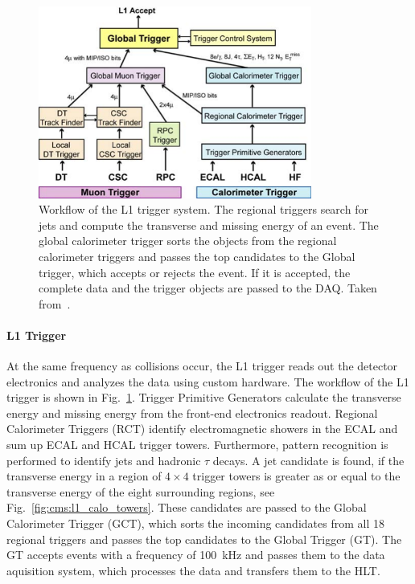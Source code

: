 \begin{figure}[htp]
    \centering
    \includegraphics[width=0.8\textwidth]{figures/cms_detector/cms_l1_trigger_new.pdf}\hfill
    \caption[The L1 Trigger of CMS]{Workflow of the L1 trigger system. The
        regional triggers search for jets and compute the transverse and missing
        energy of an event. The global calorimeter trigger sorts the objects
        from the regional calorimeter triggers and passes the top candidates to
        the Global trigger, which accepts or rejects the event. If it is
        accepted, the complete data and the trigger objects are passed to the
        DAQ. Taken from~\cite{Bayatian:922757}.} 
    \label{fig:cms:l1_trigger}
\end{figure}

\paragraph{L1 Trigger} 
At the same frequency as collisions occur, the L1 trigger reads out the detector
electronics and analyzes the data using custom hardware. The workflow of the L1
trigger is shown in Fig.~\ref{fig:cms:l1_trigger}. Trigger Primitive Generators
calculate the transverse energy and missing energy from the front-end electronics
readout. Regional Calorimeter Triggers (RCT) identify electromagnetic showers
in the ECAL and sum up ECAL and HCAL trigger towers. Furthermore, pattern
recognition is performed to identify jets and hadronic $\tau$ decays. A jet
candidate is found, if the transverse energy in a region of $4\times4$ trigger
towers is greater as or equal to the transverse energy of the eight surrounding
regions, see Fig.~\ref{fig:cms:l1_calo_towers}. These
candidates are passed to the Global Calorimeter Trigger (GCT), which sorts the
incoming candidates from all 18 regional triggers and passes the top
candidates to the Global Trigger (GT). The GT accepts events with a frequency
of \SI{100}{\kilo\hertz} and passes them to the data aquisition system, which
processes the data and transfers them to the HLT.

